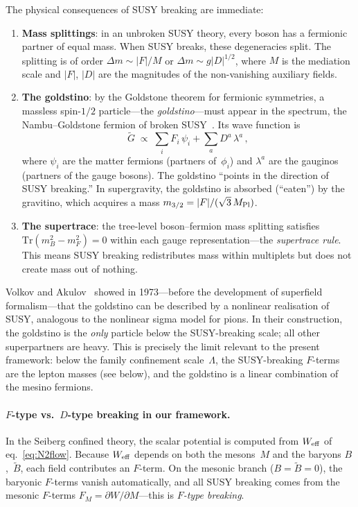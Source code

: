 \documentclass[12pt,a4paper]{article}
\newcommand{\Tr}{\mathrm{Tr}}
\begin{document}
The physical consequences of SUSY breaking are immediate:
\begin{enumerate}
  \item \textbf{Mass splittings}: in an unbroken SUSY theory,
    every boson has a fermionic partner of equal mass. When SUSY
    breaks, these degeneracies split.  The splitting is of order
    $\Delta m \sim |F|/M$ or $\Delta m \sim g|D|^{1/2}$, where
    $M$ is the mediation scale and $|F|$, $|D|$ are the magnitudes
    of the non-vanishing auxiliary fields.
  \item \textbf{The goldstino}: by the Goldstone theorem for
    fermionic symmetries, a massless spin-$1/2$
    particle---the \emph{goldstino}---must appear in the spectrum,
    the Nambu--Goldstone fermion of broken
    SUSY~\cite{VolkovAkulov:1973}. Its wave function is
    \begin{equation}
      \tilde G \;\propto\; \sum_i F_i\,\psi_i
        + \sum_a D^a\,\lambda^a\,,
      \label{eq:goldstino}
    \end{equation}
    where $\psi_i$ are the matter fermions (partners of~$\phi_i$)
    and $\lambda^a$ are the gauginos (partners of the gauge bosons).
    The goldstino ``points in the direction of SUSY breaking.''
    In supergravity, the goldstino is absorbed (``eaten'') by the
    gravitino, which acquires a mass
    $m_{3/2} = |F|/(\sqrt{3}\,M_{\rm Pl})$.
  \item \textbf{The supertrace}: the tree-level boson--fermion
    mass splitting satisfies $\Tr(m_B^2 - m_F^2) = 0$ within
    each gauge representation---the \emph{supertrace rule}. This
    means SUSY breaking redistributes mass within multiplets
    but does not create mass out of nothing.
\end{enumerate}

Volkov and Akulov~\cite{VolkovAkulov:1973} showed in 1973---before
the development of superfield formalism---that the goldstino can be
described by a nonlinear realisation of SUSY, analogous to the
nonlinear sigma model for pions. In their construction, the
goldstino is the \emph{only} particle below the SUSY-breaking scale;
all other superpartners are heavy. This is precisely the limit
relevant to the present framework: below the family confinement
scale~$\Lambda$, the SUSY-breaking $F$-terms are the lepton masses
(see below), and the goldstino is a linear combination of the
mesino fermions.

\paragraph{$F$-type vs.\ $D$-type breaking in our framework.}
In the Seiberg confined theory, the scalar potential is
computed from $W_{\rm eff}$ of eq.~\eqref{eq:N2flow}.
Because $W_{\rm eff}$ depends on both the mesons~$M$ and
the baryons $B$,~$\tilde B$, each field contributes an $F$-term.
On the mesonic branch ($B = \tilde B = 0$), the baryonic
$F$-terms vanish automatically, and all SUSY breaking
comes from the mesonic $F$-terms
$F_M = \partial W/\partial M$---this is \emph{$F$-type breaking}.
\end{document}
